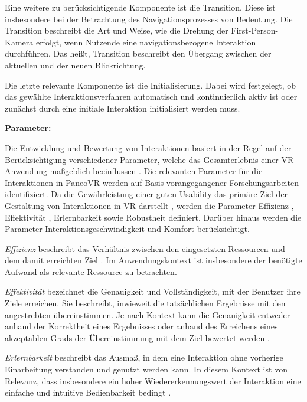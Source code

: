 Eine weitere zu berücksichtigende Komponente ist die Transition. Diese ist insbesondere bei der Betrachtung des Navigationsprozesses von Bedeutung. Die Transition beschreibt die Art und Weise, wie die Drehung der First-Person-Kamera erfolgt, wenn Nutzende eine navigationsbezogene Interaktion durchführen. Das heißt, Transition beschreibt den Übergang zwischen der aktuellen und der neuen Blickrichtung.

Die letzte relevante Komponente ist die Initialisierung. Dabei wird festgelegt, ob das gewählte Interaktionsverfahren automatisch und kontinuierlich aktiv ist oder zunächst durch eine initiale Interaktion initialisiert werden muss. 

{\normalfont \bfseries Parameter:} 


Die Entwicklung und Bewertung von Interaktionen basiert in der Regel auf der Berücksichtigung verschiedener Parameter, welche das Gesamterlebnis einer VR-Anwendung maßgeblich beeinflussen \citep{10.1145/3441852.3471230}. Die relevanten Parameter für die Interaktionen in PaneoVR werden auf Basis vorangegangener Forschungsarbeiten identifiziert. Da die Gewährleistung einer guten Usability das primäre Ziel der Gestaltung von Interaktionen in VR darstellt \citep{dorner_virtual_2019}, werden die Parameter Effizienz \citep{DINISO9241-11}, Effektivität \citep{DINISO9241-11}, Erlernbarkeit \citep{DINISO9241-110} sowie Robustheit \citep{DINISO9241-110} definiert. Darüber hinaus werden die Parameter Interaktionsgeschwindigkeit \citep{COOK2015117} und Komfort \citep{jerald_vr_2016} berücksichtigt. 

\textit{Effizienz} beschreibt das Verhältnis zwischen den eingesetzten Ressourcen und dem damit erreichten Ziel \citep{DINISO9241-11}. Im Anwendungskontext ist  insbesondere der benötigte Aufwand als relevante Ressource zu betrachten.

\textit{Effektivität} bezeichnet die Genauigkeit und Vollständigkeit, mit der Benutzer ihre Ziele erreichen. Sie beschreibt, inwieweit die tatsächlichen Ergebnisse mit den angestrebten übereinstimmen. Je nach Kontext kann die Genauigkeit entweder anhand der Korrektheit eines Ergebnisses oder anhand des Erreichens eines akzeptablen Grads der Übereinstimmung mit dem Ziel bewertet werden \citep{DINISO9241-11}.

\textit{Erlernbarkeit} beschreibt das Ausmaß, in dem eine Interaktion ohne vorherige Einarbeitung verstanden und genutzt werden kann. In diesem Kontext ist von Relevanz, dass insbesondere ein hoher Wiedererkennungswert der Interaktion eine einfache und intuitive Bedienbarkeit bedingt \citep{jerald_vr_2016}.

